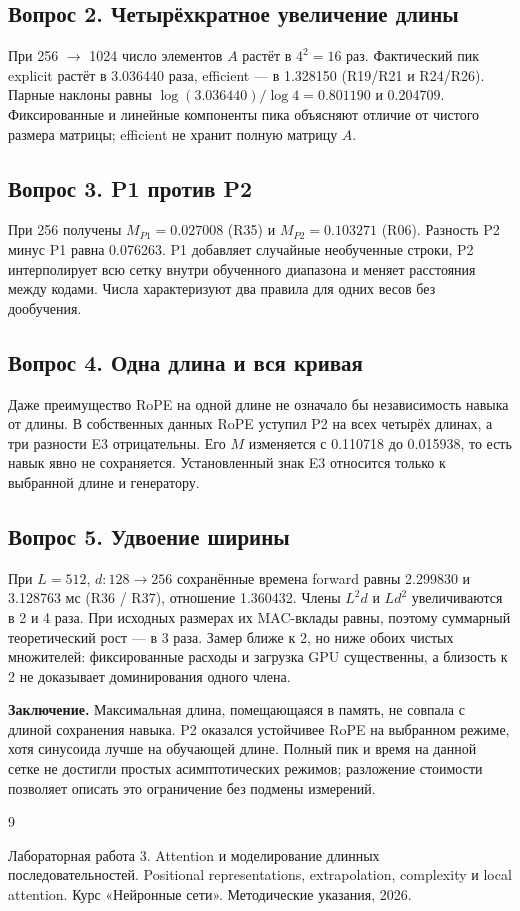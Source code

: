 \subsection*{Вопрос 2. Четырёхкратное увеличение длины}
При 256 $\to$ 1024 число элементов $A$ растёт в $4^2=16$ раз. Фактический пик explicit растёт в 3.036440 раза, efficient --- в 1.328150 (R19/R21 и R24/R26). Парные наклоны равны $\log(3.036440)/\log4=0.801190$ и 0.204709. Фиксированные и линейные компоненты пика объясняют отличие от чистого размера матрицы; efficient не хранит полную матрицу $A$.
\subsection*{Вопрос 3. P1 против P2}
При 256 получены $M_{P1}=0.027008$ (R35) и $M_{P2}=0.103271$ (R06). Разность P2 минус P1 равна 0.076263. P1 добавляет случайные необученные строки, P2 интерполирует всю сетку внутри обученного диапазона и меняет расстояния между кодами. Числа характеризуют два правила для одних весов без дообучения.
\subsection*{Вопрос 4. Одна длина и вся кривая}
Даже преимущество RoPE на одной длине не означало бы независимость навыка от длины. В собственных данных RoPE уступил P2 на всех четырёх длинах, а три разности E3 отрицательны. Его $M$ изменяется с 0.110718 до 0.015938, то есть навык явно не сохраняется. Установленный знак E3 относится только к выбранной длине и генератору.
\subsection*{Вопрос 5. Удвоение ширины}
При $L=512$, $d:128\to256$ сохранённые времена forward равны 2.299830 и 3.128763 мс (R36 / R37), отношение 1.360432. Члены $L^2d$ и $Ld^2$ увеличиваются в 2 и 4 раза. При исходных размерах их MAC-вклады равны, поэтому суммарный теоретический рост --- в 3 раза. Замер ближе к 2, но ниже обоих чистых множителей: фиксированные расходы и загрузка GPU существенны, а близость к 2 не доказывает доминирования одного члена.

\noindent\textbf{Заключение.} Максимальная длина, помещающаяся в память, не совпала с длиной сохранения навыка. P2 оказался устойчивее RoPE на выбранном режиме, хотя синусоида лучше на обучающей длине. Полный пик и время на данной сетке не достигли простых асимптотических режимов; разложение стоимости позволяет описать это ограничение без подмены измерений.
\clearpage
\renewcommand{\refname}{Список использованных источников}
\begin{thebibliography}{9}
 Лабораторная работа 3. Attention и моделирование длинных последовательностей. Positional representations, extrapolation, complexity и local attention. Курс «Нейронные сети». Методические указания, 2026.
\end{thebibliography}
\clearpage
